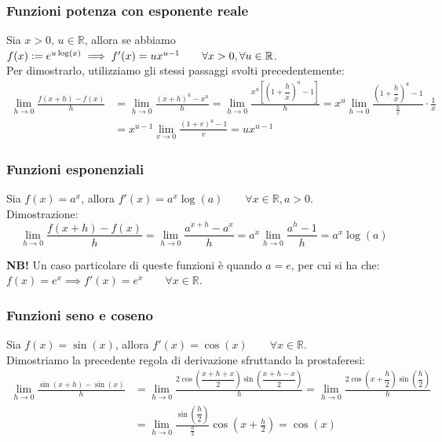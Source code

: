 \documentclass{article}
\begin{document}
\subsubsection{Funzioni potenza con esponente reale}
Sia $x > 0$, $u \in \mathbb{R}$, allora se abbiamo $f(x) \vcentcolon = e^{u\log(x)} \implies f'(x) = ux^{u - 1} \qquad \forall x > 0, \forall u \in \mathbb{R}$.\\

\noindent Per dimostrarlo, utilizziamo gli stessi passaggi svolti precedentemente:
\begin{align*}
    \lim_{h \to 0} \frac{f(x + h) - f(x)}{h} &= \lim_{h \to 0} \frac{(x + h)^u - x^u}{h} = \lim_{h \to 0} \frac{x^u\left[\left(1 + \dfrac{h}{x}\right)^u - 1\right]}{h} = x^u \lim_{h \to 0} \frac{\left(1 + \dfrac{h}{x}\right)^u - 1}{\frac{h}{x}} \cdot \frac{1}{x} \\
    &= x^{u - 1} \lim_{v \to 0} \frac{(1 + v)^u - 1}{v} = ux^{u - 1}
\end{align*}

\subsubsection{Funzioni esponenziali}
Sia $f(x) = a^x$, allora $f'(x) = a^x\log(a) \qquad \forall x \in \mathbb{R}, a > 0$.\\

\noindent Dimostrazione:
\begin{equation*}
    \lim_{h \to 0} \frac{f(x + h) - f(x)}{h} = \lim_{h \to 0} \frac{a^{x + h} - a^x}{h} = a^x \lim_{h \to 0} \frac{a^h - 1}{h} = a^x\log(a)
\end{equation*}

\noindent\textbf{NB!} Un caso particolare di queste funzioni è quando $a = e$, per cui si ha che: $f(x) = e^x \implies f'(x) = e^x \qquad \forall x \in \mathbb{R}$.

\subsubsection{Funzioni seno e coseno}
Sia $f(x) = \sin(x)$, allora $f'(x) = \cos(x) \qquad \forall x \in \mathbb{R}$. \\

\noindent Dimostriamo la precedente regola di derivazione sfruttando la prostaferesi:
\begin{align*}
    \lim_{h \to 0} \frac{\sin(x + h) - \sin(x)}{h} &= \lim_{h \to 0}\frac{2\cos\left(\dfrac{x + h + x}{2}\right)\sin\left(\dfrac{x + h - x}{2}\right)}{h} = \lim_{h \to 0} \frac{2\cos\left(x + \dfrac{h}{2}\right)\sin\left(\dfrac{h}{2}\right)}{h}\\
    &= \lim_{h \to 0} \frac{\sin\left(\dfrac{h}{2}\right)}{\frac{h}{2}}\cos\left(x + \frac{h}{2}\right) = \cos(x)
\end{align*}
\end{document}

